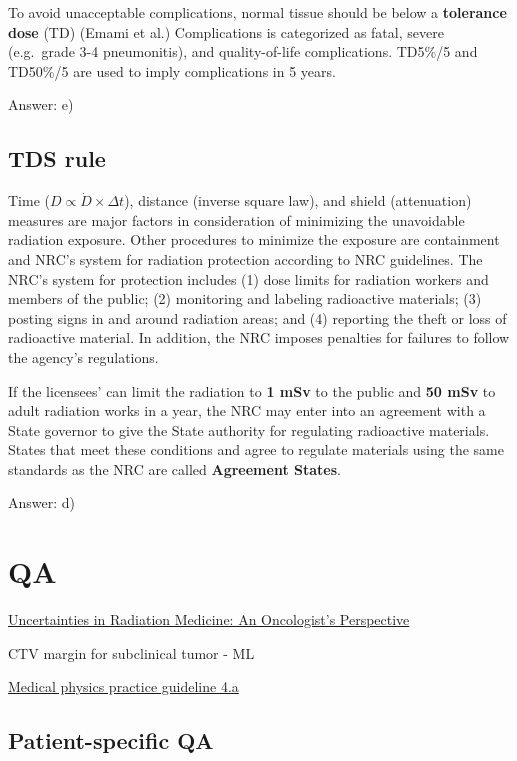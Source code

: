 \documentclass[]{book}
\theoremstyle{definition}
\theoremstyle{definition}
\theoremstyle{definition}
\theoremstyle{remark}
\begin{document}
To avoid unacceptable complications, normal tissue should be below a
\textbf{tolerance dose} (TD) (Emami et al.) Complications is categorized
as fatal, severe (e.g.~grade 3-4 pneumonitis), and quality-of-life
complications. TD5\%/5 and TD50\%/5 are used to imply complications in 5
years.

Answer: e)

\section{TDS rule}\label{tds-rule}

Time (\(D \propto \dot{D}\times \Delta t\)), distance (inverse square
law), and shield (attenuation) measures are major factors in
consideration of minimizing the unavoidable radiation exposure. Other
procedures to minimize the exposure are containment and NRC's system for
radiation protection according to NRC guidelines. The NRC's system for
protection includes (1) dose limits for radiation workers and members of
the public; (2) monitoring and labeling radioactive materials; (3)
posting signs in and around radiation areas; and (4) reporting the theft
or loss of radioactive material. In addition, the NRC imposes penalties
for failures to follow the agency's regulations.

If the licensees' can limit the radiation to \textbf{1 mSv} to the
public and \textbf{50 mSv} to adult radiation works in a year, the NRC
may enter into an agreement with a State governor to give the State
authority for regulating radioactive materials. States that meet these
conditions and agree to regulate materials using the same standards as
the NRC are called \textbf{Agreement States}.

Answer: d)

\chapter{QA}\label{qa}

\href{https://vimeo.com/76862861}{Uncertainties in Radiation Medicine:
An Oncologist's Perspective}

CTV margin for subclinical tumor - ML

\href{https://aapm.onlinelibrary.wiley.com/doi/full/10.1120/jacmp.v16i3.5431}{Medical
physics practice guideline 4.a}

\section{Patient-specific QA}\label{patient-specific-qa}
\end{document}

